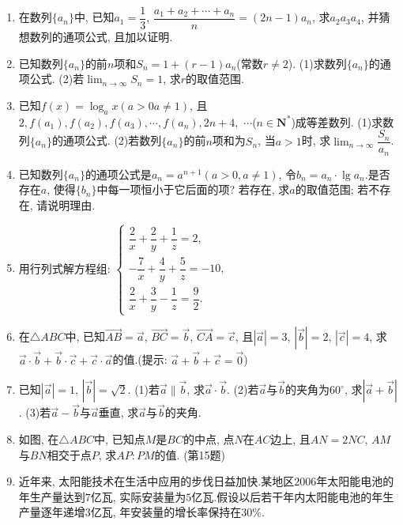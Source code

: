 \documentclass[10pt,a4paper]{article}
\begin{document}
\begin{enumerate}[1.]
\item 在数列$\{a_n\}$中, 已知$a_1=\dfrac 13$, $\dfrac{a_1+a_2+\cdots +a_n}n=(2n-1)a_n$, 求$a_2a_3a_4$, 并猜想数列的通项公式, 且加以证明.
\item 已知数列$\{a_n\}$的前$n$项和$S_n=1+(r-1)a_n$(常数$r\ne 2$).
(1)求数列$\{a_n\}$的通项公式.
(2)若$\displaystyle\lim_{n\to\infty}S_n=1$, 求$r$的取值范围.
\item 已知$f(x)=\log _ax(a>0a\ne 1)$, 且$2,f(a_1),f(a_2),f(a_3),\cdots ,f(a_n),2n+4,$ $\cdots $($n\in \mathbf{N}^*$)成等差数列.
(1)求数列$\{a_n\}$的通项公式.
(2)若数列$\{a_n\}$的前$n$项和为$S_n$, 当$a>1$时, 求$\displaystyle\lim_{n\to\infty}\dfrac{S_n}{a_n}$.
\item 已知数列$\{a_n\}$的通项公式是$a_n=a^{n+1}(a>0,a\ne 1)$, 令$b_n=a_n\cdot \lg a_n$.是否存在$a$, 使得$\{b_n\}$中每一项恒小于它后面的项? 若存在, 求$a$的取值范围; 若不存在, 请说明理由.
\item 用行列式解方程组: $\begin{cases}
    \dfrac 2x+\dfrac 2y+\dfrac 1z=2,  \\-\dfrac 7x+\dfrac 4y+\dfrac 5z=-10,  \\\dfrac 2x+\dfrac 3y-\dfrac 1z=\dfrac 92.  \end{cases}$
\item 在$\triangle ABC$中, 已知$\overrightarrow{AB}=\overrightarrow a$, $\overrightarrow{BC}=\overrightarrow b$, $\overrightarrow{CA}=\overrightarrow c$, 且$|\overrightarrow a|=3$, $|\overrightarrow b|=2$, $|\overrightarrow c|=4$, 求$\overrightarrow a\cdot \overrightarrow b+\overrightarrow b\cdot \overrightarrow c+\overrightarrow c\cdot \overrightarrow a$的值.(提示: $\overrightarrow a+\overrightarrow b+\overrightarrow c=\overrightarrow 0$)
\item 已知$|\overrightarrow a|=1$, $|\overrightarrow b|=\sqrt 2$.
(1)若$\overrightarrow a\parallel \overrightarrow b$, 求$\overrightarrow a\cdot \overrightarrow b$.
(2)若$\overrightarrow a$与$\overrightarrow b$的夹角为$60^{\circ }$, 求$|\overrightarrow a+\overrightarrow b|$.
(3)若$\overrightarrow a-\overrightarrow b$与$\overrightarrow a$垂直, 求$\overrightarrow a$与$\overrightarrow b$的夹角.
\item 如图, 在$\triangle ABC$中, 已知点$M$是$BC$的中点, 点$N$在$AC$边上, 且$AN=2NC$, $AM$与$BN$相交于点$P$, 求$AP:PM$的值.
(第15题)
\item 近年来, 太阳能技术在生活中应用的步伐日益加快.某地区$2006$年太阳能电池的年生产量达到$7$亿瓦, 实际安装量为$5$亿瓦.假设以后若干年内太阳能电池的年生产量逐年递增$3$亿瓦, 年安装量的增长率保持在$30\%$.

\end{enumerate}
\end{document}
